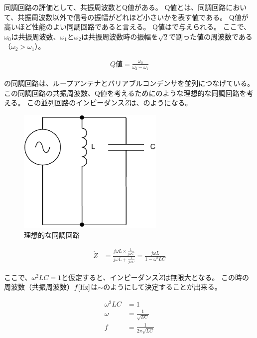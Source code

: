\documentclass[report.tex]{subfiles}
\begin{document}
同調回路の評価として、共振周波数とQ値がある。
Q値とは、同調回路において、共振周波数以外で信号の振幅がどれほど小さいかを表す値である。
Q値が高いほど性能のよい同調回路であると言える。
Q値はで与えられる\cite{ノート}。
ここで、\(\omega_0\)は共振周波数、\(\omega_1\)と\(\omega_2\)は共振周波数時の振幅を\(\sqrt{2}\)で割った値の周波数である（\(\omega_2 > \omega_1\)）。

\begin{align}
	Q値 =\frac{\omega_0}{\omega_2 - \omega_1} \label{eq:Q値}
\end{align}

の同調回路は、ループアンテナとバリアブルコンデンサを並列につなげている。
この同調回路の共振周波数、Q値を考えるためにのような理想的な同調回路を考える。
この並列回路のインピーダンス\(\dot{Z}\)は、のようになる。

\begin{figure}[H]
	\centering
	\includegraphics[width=7cm]{fig/kyo.pdf}
	\caption{理想的な同調回路}
	\label{fig:kyo}
\end{figure}

\begin{align}
	\dot{Z} & = \frac{j \omega L \times \frac{1}{j \omega C}}{j \omega L + \frac{1}{j \omega C}} = \frac{j \omega L}{1 - \omega^2 LC} \label{eq:impedance}
\end{align}

ここで、$\omega^2 LC = 1$と仮定すると、インピーダンス\(\dot{Z}\)は無限大となる。
この時の周波数（共振周波数）\(f\rm{[Hz]}\)は\(\sim\)のようにして決定することが出来る。

\begin{align}
	\omega^2 LC & = 1                            \label{eq:resonance2} \\
	\omega      & = \frac{1}{\sqrt{LC}}                                \\
	f           & = \frac{1}{2 \pi \sqrt{LC}} \label{eq:resonance}
\end{align}
\end{document}

